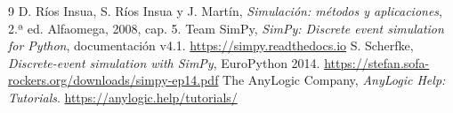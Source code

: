 \documentclass[11pt,a4paper]{article}
\begin{document}
\begin{thebibliography}{9}
 D. Ríos Insua, S. Ríos Insua y J. Martín, \textit{Simulación: métodos
y aplicaciones}, 2.ª ed. Alfaomega, 2008, cap. 5.
 Team SimPy, \textit{SimPy: Discrete event simulation for Python},
documentación v4.1. \url{https://simpy.readthedocs.io}
 S. Scherfke, \textit{Discrete-event simulation with SimPy},
EuroPython 2014. \url{https://stefan.sofa-rockers.org/downloads/simpy-ep14.pdf}
 The AnyLogic Company, \textit{AnyLogic Help: Tutorials}.
\url{https://anylogic.help/tutorials/}
\end{thebibliography}
\end{document}

